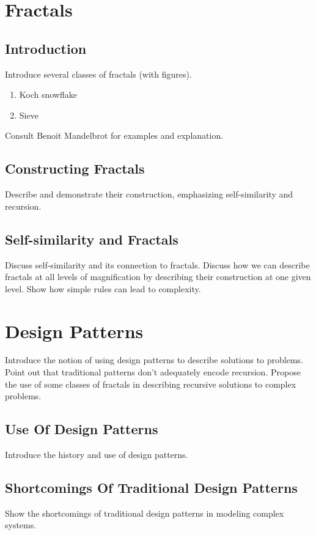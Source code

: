 \documentclass[jou,apacite]{apa6}
\begin{document}
\section{Fractals}  %
\subsection{Introduction}
Introduce several classes of fractals (with figures).
\begin{enumerate}
  \item Koch snowflake
  \item Sieve 
\end{enumerate}
Consult Benoit Mandelbrot for examples and explanation.

\subsection{Constructing Fractals}
Describe and demonstrate their construction, emphasizing self-similarity and recursion.

\subsection{Self-similarity and Fractals}
Discuss self-similarity and its connection to fractals.  Discuss how we can describe fractals at all levels of magnification by describing their construction at one given level.  Show how simple rules can lead to complexity.

\section{Design Patterns}  %
Introduce the notion of using design patterns to describe solutions to problems.  Point out that traditional patterns don't adequately encode recursion.  Propose the use of some classes of fractals in describing recursive solutions to complex problems.
\subsection{Use Of Design Patterns}
Introduce the history and use of design patterns.~\cite{Gamma}

\subsection{Shortcomings Of Traditional Design Patterns}
Show the shortcomings of traditional design patterns in modeling complex systems.
\end{document}
